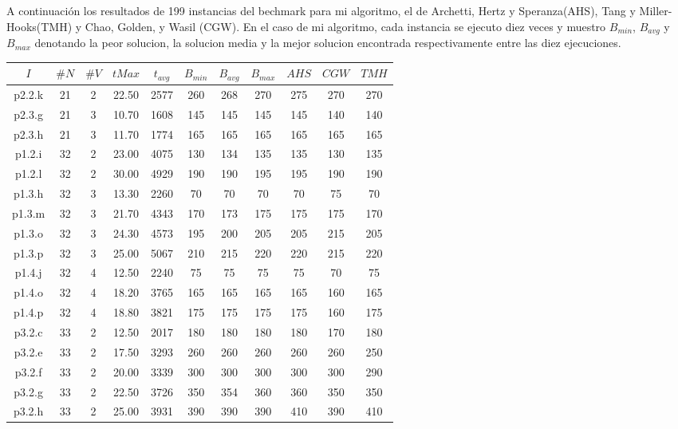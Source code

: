 \bigskip

A continuación los resultados de 199 instancias del bechmark para mi algoritmo, el de Archetti, Hertz y Speranza(AHS), Tang y Miller-Hooks(TMH) y Chao, Golden, y Wasil (CGW). En el caso de mi algoritmo, cada instancia se ejecuto diez veces y muestro $B_{min}$, $B_{avg}$ y $B_{max}$ denotando la peor solucion, la solucion media y la mejor solucion encontrada respectivamente entre las diez ejecuciones.


\begin{center}
\begin{tabular}{ |c|c|c|c|c|c|c|c|c|c|c| } 
\hline
$I$ & $\#N$ & $\#V$ & $tMax$ & $t_{avg}$ & $B_{min}$ & $B_{avg}$ & $B_{max}$ & $AHS$ & $CGW$ & $TMH$\\
\hline
p2.2.k & 21 & 2 & 22.50 & 2577 & 260 & 268 & 270 & 275 & 270 & 270  \\
p2.3.g & 21 & 3 & 10.70 & 1608 & 145 & 145 & 145 & 145 & 140 & 140  \\
p2.3.h & 21 & 3 & 11.70 & 1774 & 165 & 165 & 165 & 165 & 165 & 165  \\
p1.2.i & 32 & 2 & 23.00 & 4075 & 130 & 134 & 135 & 135 & 130 & 135  \\
p1.2.l & 32 & 2 & 30.00 & 4929 & 190 & 190 & 195 & 195 & 190 & 190  \\
p1.3.h & 32 & 3 & 13.30 & 2260 & 70 & 70 & 70 & 70 & 75 & 70  \\
p1.3.m & 32 & 3 & 21.70 & 4343 & 170 & 173 & 175 & 175 & 175 & 170  \\
p1.3.o & 32 & 3 & 24.30 & 4573 & 195 & 200 & 205 & 205 & 215 & 205  \\
p1.3.p & 32 & 3 & 25.00 & 5067 & 210 & 215 & 220 & 220 & 215 & 220  \\
p1.4.j & 32 & 4 & 12.50 & 2240 & 75 & 75 & 75 & 75 & 70 & 75  \\
p1.4.o & 32 & 4 & 18.20 & 3765 & 165 & 165 & 165 & 165 & 160 & 165  \\
p1.4.p & 32 & 4 & 18.80 & 3821 & 175 & 175 & 175 & 175 & 160 & 175  \\
p3.2.c & 33 & 2 & 12.50 & 2017 & 180 & 180 & 180 & 180 & 170 & 180  \\
p3.2.e & 33 & 2 & 17.50 & 3293 & 260 & 260 & 260 & 260 & 260 & 250  \\
p3.2.f & 33 & 2 & 20.00 & 3339 & 300 & 300 & 300 & 300 & 300 & 290  \\
p3.2.g & 33 & 2 & 22.50 & 3726 & 350 & 354 & 360 & 360 & 350 & 350  \\
p3.2.h & 33 & 2 & 25.00 & 3931 & 390 & 390 & 390 & 410 & 390 & 410  \\

\end{tabular}
\end{center}
